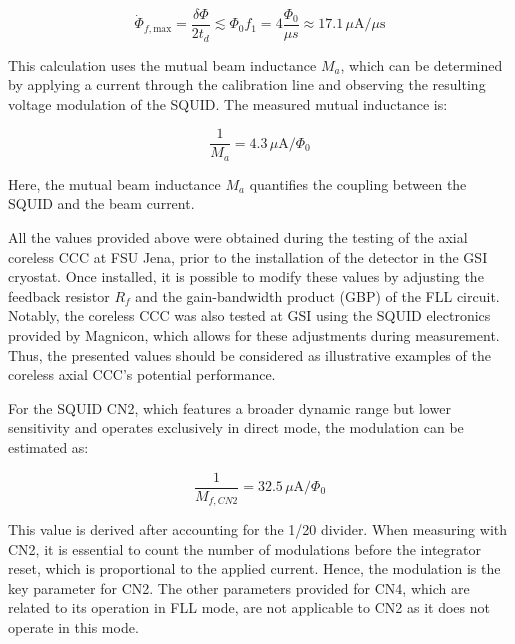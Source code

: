 \documentclass[12pt,a4paper]{report}
\begin{document}
        \begin{equation}
        	\dot{\Phi}_{f,\text{max}} = \frac{\delta \Phi}{2 t_d} \lesssim \Phi_0 f_1 = 4 \frac{\Phi_0}{\mu s} \approx 17.1 \, \mu \text{A}/ \mu \text{s}
        \end{equation}
        
        This calculation uses the mutual beam inductance $M_a$, which can be determined by applying a current through the calibration line and observing the resulting voltage modulation of the SQUID. The measured mutual inductance is:
        
        \begin{equation}
        	\frac{1}{M_a} = 4.3 \, \mu \text{A}/\Phi_0
        \end{equation}
        
        Here, the mutual beam inductance $M_a$ quantifies the coupling between the SQUID and the beam current.
        
        All the values provided above were obtained during the testing of the axial coreless CCC at FSU Jena, prior to the installation of the detector in the GSI cryostat. Once installed, it is possible to modify these values by adjusting the feedback resistor $R_f$ and the gain-bandwidth product (GBP) of the FLL circuit. Notably, the coreless CCC was also tested at GSI using the SQUID electronics provided by Magnicon, which allows for these adjustments during measurement. Thus, the presented values should be considered as illustrative examples of the coreless axial CCC's potential performance.
        
        For the SQUID CN2, which features a broader dynamic range but lower sensitivity and operates exclusively in direct mode, the modulation can be estimated as:
        
        \begin{equation}
        	\frac{1}{M_{f,CN2}} = 32.5 \, \mu \text{A}/\Phi_0
        \end{equation}
        
        This value is derived after accounting for the 1/20 divider. When measuring with CN2, it is essential to count the number of modulations before the integrator reset, which is proportional to the applied current. Hence, the modulation is the key parameter for CN2. The other parameters provided for CN4, which are related to its operation in FLL mode, are not applicable to CN2 as it does not operate in this mode.
        
\end{document}
